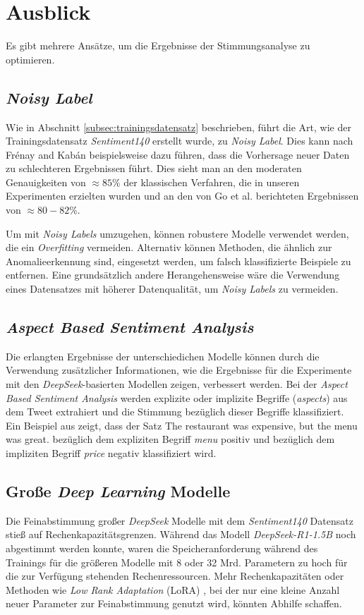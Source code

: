 \section{Ausblick}\label{sec:ausblick}

Es gibt mehrere Ansätze, um die Ergebnisse der Stimmungsanalyse zu optimieren.

\subsection{\textit{Noisy Label}}
Wie in Abschnitt \ref{subsec:trainingsdatensatz} beschrieben, führt die Art, wie der Trainingsdatensatz \textit{Sentiment140} erstellt wurde, zu \textit{Noisy Label}.
Dies kann nach Fr{\'e}nay and Kab{\'a}n \cite{NoisyLabel2014} beispielsweise dazu führen, dass die Vorhersage neuer Daten zu schlechteren Ergebnissen führt.
Dies sieht man an den moderaten Genauigkeiten von $\approx{85}\%$ der klassischen Verfahren, die in unseren Experimenten erzielten wurden und an den von Go et al. \cite{go2009twitter} berichteten Ergebnissen von $\approx{80-82}\%$.

Um mit \textit{Noisy Labels} umzugehen, können robustere Modelle verwendet werden, die ein \textit{Overfitting} vermeiden.
Alternativ können Methoden, die ähnlich zur Anomalieerkennung sind, eingesetzt werden, um falsch klassifizierte Beispiele zu entfernen.
Eine grundsätzlich andere Herangehensweise wäre die Verwendung eines Datensatzes mit höherer Datenqualität, um \textit{Noisy Labels} zu vermeiden.

\subsection{\textit{Aspect Based Sentiment Analysis}}

Die erlangten Ergebnisse der unterschiedichen Modelle können durch die Verwendung zusätzlicher Informationen, wie die Ergebnisse für die Experimente mit den \textit{DeepSeek}-basierten Modellen zeigen, verbessert werden.
Bei der \textit{Aspect Based Sentiment Analysis} werden explizite oder implizite Begriffe (\textit{aspects}) aus dem Tweet extrahiert und die Stimmung bezüglich dieser Begriffe klassifiziert.
Ein Beispiel aus \cite{Hua_2024} zeigt, dass der Satz \glqq The restaurant was expensive, but the menu was great.\grqq{} bezüglich dem expliziten Begriff \textit{menu} positiv und bezüglich dem impliziten Begriff \textit{price} negativ klassifiziert wird.

\subsection{Große \textit{Deep Learning} Modelle}

Die Feinabstimmung großer \textit{DeepSeek} Modelle mit dem \textit{Sentiment140} Datensatz stieß auf Rechenkapazitätsgrenzen.
Während das Modell \textit{DeepSeek-R1-1.5B} noch abgestimmt werden konnte, waren die Speicheranforderung während des Trainings für die größeren Modelle mit 8 oder 32 Mrd. Parametern zu hoch für die zur Verfügung stehenden Rechenressourcen.
Mehr Rechenkapazitäten oder Methoden wie \textit{Low Rank Adaptation} (LoRA) \cite{lora2021}, bei der nur eine kleine Anzahl neuer Parameter zur Feinabstimmung genutzt wird, könnten Abhilfe schaffen.
